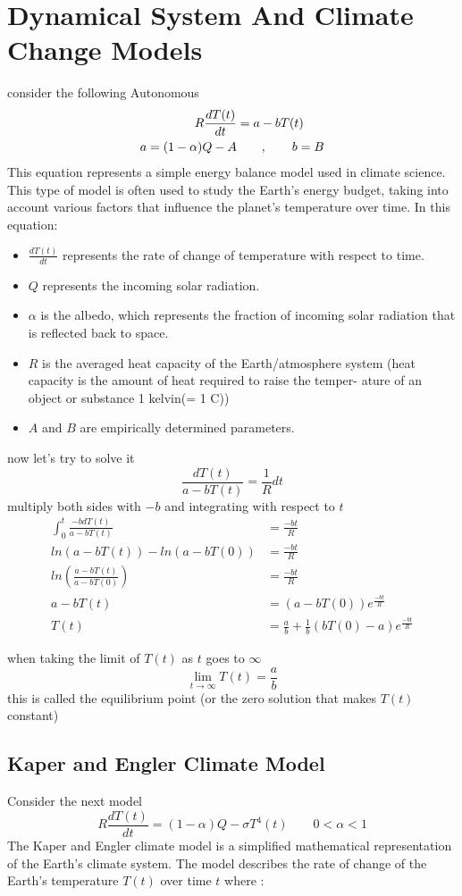 \documentclass[]{article}
\begin{document}
\section{Dynamical System And Climate Change Models}

consider the following Autonomous
\begin{align*}
    R \frac{dT(t)}{dt} &= a - bT(t)
    \\
    a = (1-\alpha)Q-A &\quad\quad,\quad\quad b = B 
\end{align*}
This equation represents a simple energy balance model used in climate science.
This type of model is often used to study the Earth's energy budget, 
taking into account various factors that influence the planet's temperature over time. 
In this equation:
\begin{itemize}
    \item $\displaystyle \frac{dT(t)}{dt}$ represents the rate of change of temperature with respect to time.
    \item $Q$ represents the incoming solar radiation.
    \item $\alpha$ is the albedo, which represents the fraction of incoming solar radiation that is reflected back to space.
    \item $R$ is the averaged heat capacity of the Earth/atmosphere
    system (heat capacity is the amount of heat required to raise the temper-
    ature of an object or substance 1 kelvin(= 1 C))
    \item $A$ and $B$ are empirically determined parameters.
\end{itemize}
now let's try to solve it 
\[
\frac{dT(t)}{a - bT(t)} = \frac{1}{R} dt
\]
multiply both sides with $-b$ and integrating with respect to $t$
\begin{align*}
    \int_{0}^{t} \frac{-b dT(t)}{a - bT(t)} &= \frac{-bt}{R}    
    \\
    ln(a - bT(t)) - ln(a - bT(0)) &= \frac{-bt}{R}
\\
ln \left(\frac{a - bT(t)}{a - bT(0)}\right) &= \frac{-bt}{R}
\\
a - bT(t) &= (a - bT(0))e^{\frac{-bt}{R}}
\\
T(t) &= \frac{a}{b} + \frac{1}{b}(bT(0)-a)e^{\frac{-bt}{R}}
\end{align*}

when taking the limit of $T(t)$ as $t$ goes to $\infty$
\[
\lim_{t \to \infty} T(t) = \frac{a}{b}
\]
this is called the equilibrium point (or the zero solution that makes $T(t)$ constant)
\subsection{Kaper and Engler Climate Model}
Consider the next model
\[
R \frac{dT(t)}{dt} = (1-\alpha)Q - \sigma T^4(t) \qquad 0<\alpha <1
\]
The Kaper and Engler climate model is a simplified mathematical representation of the Earth's climate system. 
The model describes the rate of change of the Earth's temperature $T(t)$ over time $t$ where :
\end{document}

